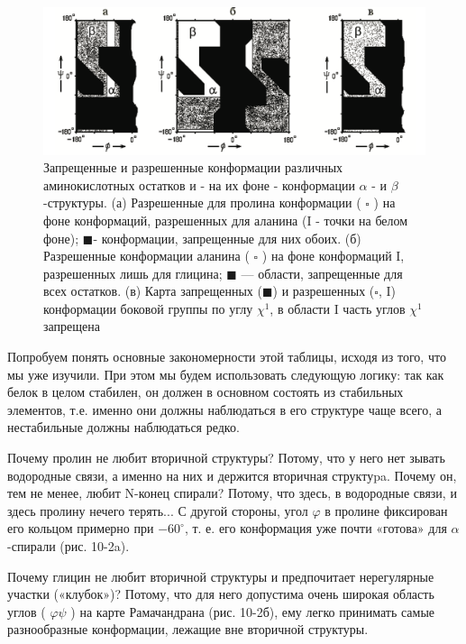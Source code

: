 \documentclass[
11pt,%
tightenlines,%
twoside,%
onecolumn,%
nofloats,%
nobibnotes,%
nofootinbib,%
superscriptaddress,%
noshowpacs,%
centertags]%
{revtex4}
\begin{document}
\begin{figure}
	\centering
	\includegraphics[width=\textwidth]{zone}
	\caption{Запрещенные и разрешенные конформации различных аминокислотных остатков и - на их фоне - конформации $\alpha$ - и $\beta$-структуры. (а) Разрешенные для пролина конформации ( $\square$ ) на фоне конформаций, разрешенных для аланина (I - точки на белом фоне); $\blacksquare$- конформации, запрещенные для них обоих. (б) Разрешенные конформации аланина ( $\square$ ) на фоне конформаций I, разрешенных лишь для глицина; $\blacksquare$ — области, запрещенные для всех остатков. (в) Карта запрещенных ($\blacksquare$) и разрешенных ($\square$, I) конформации боковой группы по углу $\chi^1$, в области I часть углов $\chi^1$ запрещена}
\end{figure}
Попробуем понять основные закономерности этой таблицы, исходя из того, что мы уже изучили. При этом мы будем использовать следующую логику: так как белок в целом стабилен, он должен в основном состоять из стабильных элементов, т.е. именно они должны наблюдаться в его структуре чаще всего, а нестабильные должны наблюдаться редко.

Почему пролин не любит вторичной структуры? Потому, что у него нет зывать водородные связи, а именно на них и держится вторичная структуpa. Почему он, тем не менее, любит N-конец спирали? Потому, что здесь, в водородные связи, и здесь пролину нечего терять... С другой стороны, угол $\varphi$ в пролине фиксирован его кольцом примерно при $-60^{\circ}$, т. е. его конформация уже почти «готова» для $\alpha$-спирали (рис. 10-2a).


Почему глицин не любит вторичной структуры и предпочитает нерегулярные участки («клубок»)? Потому, что для него допустима очень широкая область углов ( $\varphi \psi$ ) на карте Рамачандрана (рис. 10-2б), ему легко принимать самые разнообразные конформации, лежащие вне вторичной структуры.
\end{document}
